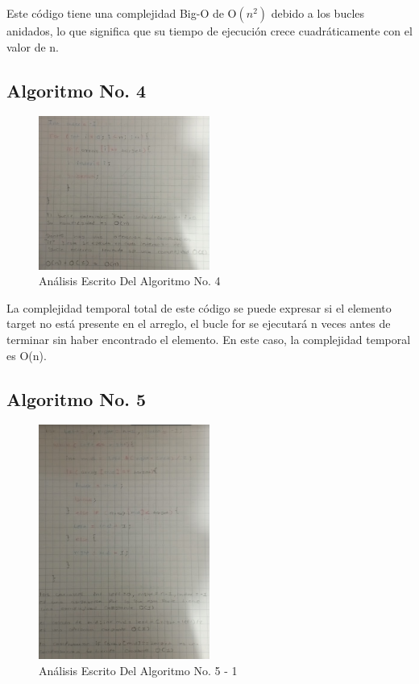 \documentclass[journal, spanish]{IEEEtran}
\begin{document}
Este código tiene una complejidad Big-O de O$(n^2)$ debido a los bucles anidados, lo que significa que su tiempo de ejecución crece cuadráticamente con el valor de n.

\subsection{Algoritmo No. 4}

\begin{figure}[H]
  \centering
  \includegraphics[width=0.5\textwidth]{images/Captura de pantalla 2023-09-13 032834.png}
  \caption{Análisis Escrito Del Algoritmo No. 4}
  \label{fig:nombre_de_tu_imagen}
\end{figure}

La complejidad temporal total de este código se puede expresar si el elemento target no está presente en el arreglo, el bucle for se ejecutará n veces antes de terminar sin haber encontrado el elemento. En este caso, la complejidad temporal es O(n).

\subsection{Algoritmo No. 5}

\begin{figure}[H]
  \centering
  \includegraphics[width=0.5\textwidth]{images/Captura de pantalla 2023-09-13 033301.png}
  \caption{Análisis Escrito Del Algoritmo No. 5 - 1}
  \label{fig:nombre_de_tu_imagen}
\end{figure}
\end{document}
